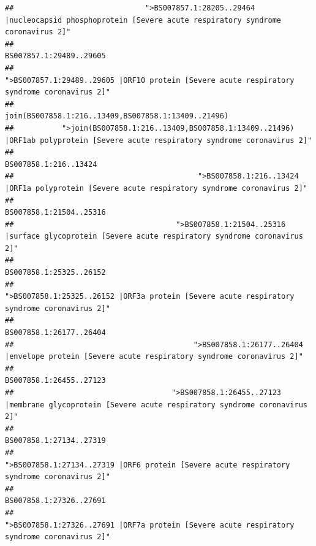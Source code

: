 \documentclass[
]{article}
\begin{document}
\begin{verbatim}
##                              ">BS007857.1:28205..29464 |nucleocapsid phosphoprotein [Severe acute respiratory syndrome coronavirus 2]" 
##                                                                                                                BS007857.1:29489..29605 
##                                            ">BS007857.1:29489..29605 |ORF10 protein [Severe acute respiratory syndrome coronavirus 2]" 
##                                                                                    join(BS007858.1:216..13409,BS007858.1:13409..21496) 
##           ">join(BS007858.1:216..13409,BS007858.1:13409..21496) |ORF1ab polyprotein [Severe acute respiratory syndrome coronavirus 2]" 
##                                                                                                                  BS007858.1:216..13424 
##                                          ">BS007858.1:216..13424 |ORF1a polyprotein [Severe acute respiratory syndrome coronavirus 2]" 
##                                                                                                                BS007858.1:21504..25316 
##                                     ">BS007858.1:21504..25316 |surface glycoprotein [Severe acute respiratory syndrome coronavirus 2]" 
##                                                                                                                BS007858.1:25325..26152 
##                                            ">BS007858.1:25325..26152 |ORF3a protein [Severe acute respiratory syndrome coronavirus 2]" 
##                                                                                                                BS007858.1:26177..26404 
##                                         ">BS007858.1:26177..26404 |envelope protein [Severe acute respiratory syndrome coronavirus 2]" 
##                                                                                                                BS007858.1:26455..27123 
##                                    ">BS007858.1:26455..27123 |membrane glycoprotein [Severe acute respiratory syndrome coronavirus 2]" 
##                                                                                                                BS007858.1:27134..27319 
##                                             ">BS007858.1:27134..27319 |ORF6 protein [Severe acute respiratory syndrome coronavirus 2]" 
##                                                                                                                BS007858.1:27326..27691 
##                                            ">BS007858.1:27326..27691 |ORF7a protein [Severe acute respiratory syndrome coronavirus 2]" 

\end{verbatim}
\end{document}
